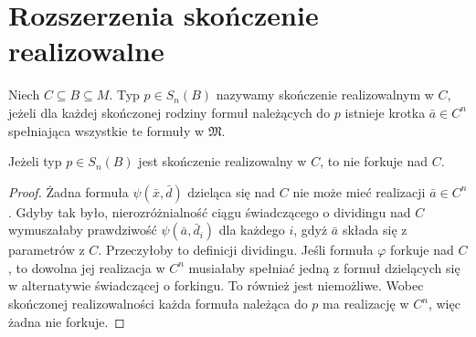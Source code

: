 \section{Rozszerzenia skończenie realizowalne}

\begin{definicja}
\label{def:mod-finite-satisfiability}
Niech $C\subseteq B\subseteq M$.
Typ $p\in S_n(B)$ nazywamy skończenie
realizowalnym w $C$, jeżeli dla każdej
skończonej rodziny formuł należących do $p$
istnieje krotka $\bar a\in C^n$ spełniająca
wszystkie te formuły w $\mathfrak M$.
\end{definicja}

\begin{lemat}
\label{lem:mod-finitely-satisfiable-nonforking}
Jeżeli typ $p\in S_n(B)$ jest skończenie
realizowalny w $C$, to nie forkuje nad $C$.
\end{lemat}
\begin{proof}
Żadna formuła $\psi(\bar x,\bar d)$
dzieląca się nad $C$ nie może mieć
realizacji $\bar a\in C^n$.
Gdyby tak było, nierozróżnialność ciągu
świadczącego o dividingu nad $C$
wymuszałaby prawdziwość
$\psi(\bar a,\bar d_i)$ dla każdego $i$,
gdyż $\bar a$ składa się z parametrów z $C$.
Przeczyłoby to definicji dividingu.
Jeśli formuła $\varphi$ forkuje nad $C$,
to dowolna jej realizacja w $C^n$
musiałaby spełniać jedną z formuł
dzielących się w alternatywie świadczącej
o forkingu. To również jest niemożliwe.
Wobec skończonej realizowalności każda
formuła należąca do $p$ ma realizację
w $C^n$, więc żadna nie forkuje.
\end{proof}

